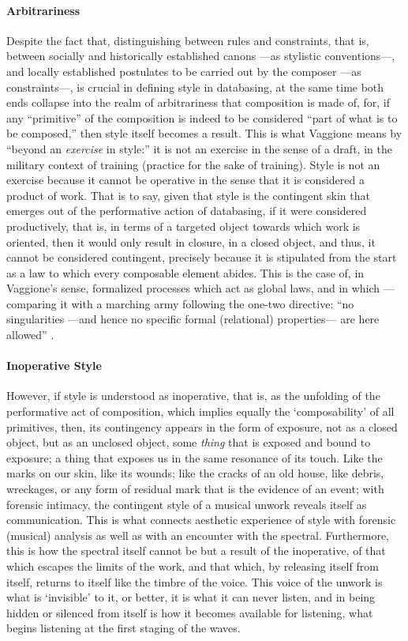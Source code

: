 \paragraph{Arbitrariness}
Despite the fact that, distinguishing between rules and constraints, that is, between socially and historically established canons ---as stylistic conventions---, and locally established postulates to be carried out by the composer ---as constraints---, is crucial in defining style in databasing, at the same time both ends collapse into the realm of arbitrariness that composition is made of, for, if any ``primitive'' of the composition is indeed to be considered ``part of what is to be composed,'' then style itself becomes a result. This is what Vaggione means by ``beyond an \textit{exercise} in style:'' it is not an exercise in the sense of a draft, in the military context of training (practice for the sake of training). Style is not an exercise because it cannot be operative in the sense that it is considered a product of work. That is to say, given that style is the contingent skin that emerges out of the performative action of databasing, if it were considered productively, that is, in terms of a targeted object towards which work is oriented, then it would only result in closure, in a closed object, and thus, it cannot be considered contingent, precisely because it is stipulated from the start as a law to which every composable element abides. This is the case of, in Vaggione's sense, formalized processes which act as global laws, and in which ---comparing it with a marching army following the one-two directive: ``no singularities ---and hence no specific formal (relational) properties--- are here allowed'' \parencite[101]{Vag93:Det}.

\paragraph{Inoperative Style}
However, if style is understood as inoperative, that is, as the unfolding of the performative act of composition, which implies equally the `composability' of all primitives, then, its contingency appears in the form of exposure, not as a closed object, but as an unclosed object, some \textit{thing} that is exposed and bound to exposure; a thing that exposes us in the same resonance of its touch. Like the marks on our skin, like its wounds; like the cracks of an old house, like debris, wreckages, or any form of residual mark that is the evidence of an event; with forensic intimacy, the contingent style of a musical unwork reveals itself as communication. This is what connects aesthetic experience of style with forensic (musical) analysis as well as with an encounter with the spectral. Furthermore, this is how the spectral itself cannot be but a result of the inoperative, of that which escapes the limits of the work, and that which, by releasing itself from itself, returns to itself like the timbre of the voice. This voice of the unwork is what is `invisible' to it, or better, it is what it can never listen, and in being hidden or silenced from itself is how it becomes available for listening, what begins listening at the first staging of the waves.
